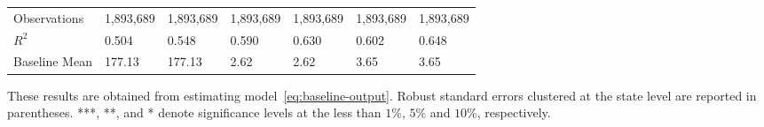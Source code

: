 \begin{table}[H]
{\begin{tabular}{@{}lllllll@{}}
            Observations      & 1,893,689 & 1,893,689 & 1,893,689 & 1,893,689 & 1,893,689 & 1,893,689 \\
            $R^2$             & 0.504     & 0.548     & 0.590     & 0.630     & 0.602     & 0.648     \\
            Baseline Mean     & 177.13    & 177.13    & 2.62      & 2.62      & 3.65      & 3.65      \\ \bottomrule\bottomrule
        \end{tabular}%
    }
    \begin{minipage}{18cm}
        \vspace{0.05in}
        These results are obtained from estimating model~\ref{eq:baseline-output}. Robust standard errors clustered at the state level are reported in parentheses. ***, **, and * denote significance levels at the less than $1\%$, $5\%$ and $10\%$, respectively.
    \end{minipage}
\end{table}